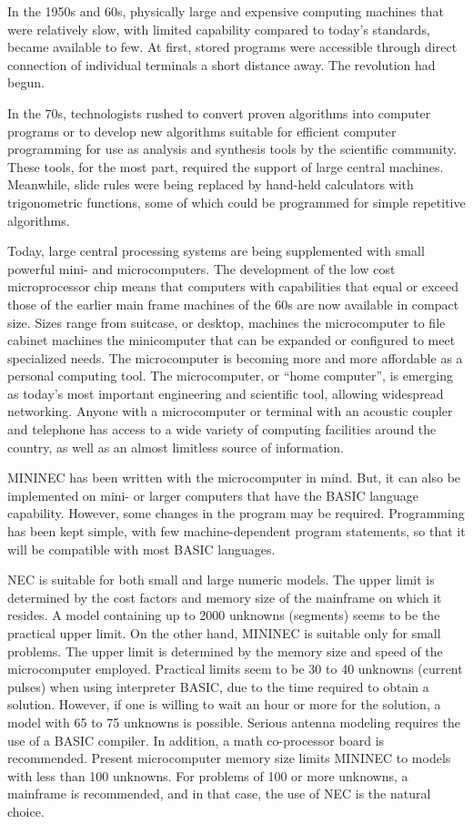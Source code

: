 \documentclass[12pt]{article}
\begin{document}
In the 1950s and 60s, physically large and expensive computing machines
that were relatively slow, with limited capability compared to today's
standards, became available to few. At first, stored programs were
accessible through direct connection of individual terminals a short
distance away. The revolution had begun.

In the 70s, technologists rushed to convert proven algorithms into
computer programs or to develop new algorithms suitable for efficient
computer programming for use as analysis and synthesis tools by the
scientific community. These tools, for the most part, required the
support of large central machines. Meanwhile, slide rules were being
replaced by hand-held calculators with trigonometric functions, some of
which could be programmed for simple repetitive algorithms.

Today, large central processing systems are being supplemented with
small powerful mini- and microcomputers. The development of the low cost
microprocessor chip means that computers with capabilities that equal or
exceed those of the earlier main frame machines of the 60s are now
available in compact size. Sizes range from suitcase, or desktop,
machines the microcomputer to file cabinet machines the minicomputer
that can be expanded or configured to meet specialized needs. The
microcomputer is becoming more and more affordable as a personal
computing tool. The microcomputer, or ``home computer'', is emerging as
today's most important engineering and scientific tool, allowing
widespread networking. Anyone with a microcomputer or terminal with an
acoustic coupler and telephone has access to a wide variety of computing
facilities around the country, as well as an almost limitless source of
information.

MININEC has been written with the microcomputer in mind. But, it can
also be implemented on mini- or larger computers that have the BASIC
language capability. However, some changes in the program may be
required. Programming has been kept simple, with few machine-dependent
program statements, so that it will be compatible with most BASIC
languages.

NEC is suitable for both small and large numeric models. The upper limit
is determined by the cost factors and memory size of the mainframe on
which it resides. A model containing up to 2000 unknowns (segments)
seems to be the practical upper limit. On the other hand, MININEC is
suitable only for small problems. The upper limit is determined by the
memory size and speed of the microcomputer employed. Practical limits
seem to be 30 to 40 unknowns (current pulses) when using interpreter
BASIC, due to the time required to obtain a solution. However, if one is
willing to wait an hour or more for the solution, a model with 65 to 75
unknowns is possible. Serious antenna modeling requires the use of a
BASIC compiler. In addition, a math co-processor board is recommended.
Present microcomputer memory size limits MININEC to models with less
than 100 unknowns. For problems of 100 or more unknowns, a mainframe is
recommended, and in that case, the use of NEC is the natural choice.
\end{document}
